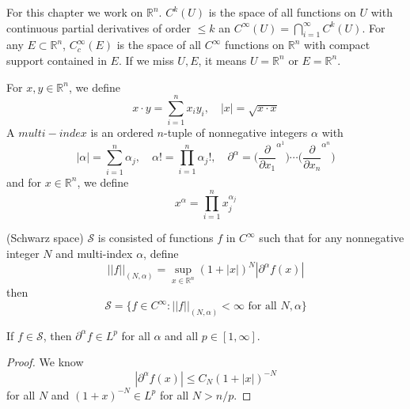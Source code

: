 \documentclass[lang=en, color=blue, ]{elegantbook}
\newcommand{\R}{\mathbb{R}}
\newcommand{\Sch}{\mathcal{S}}
\begin{document}
\begin{definition}
    For this chapter we work on $\R^n$. $C^k(U)$ is the space of all functions on $U$ with continuous partial derivatives of order $\leq k$ an $C^{\infty}(U) = \bigcap_{i=1}^{\infty}C^k(U)$. For any $E\subset \R^n$, $C_c^{\infty}(E)$ is the space of all $C^{\infty}$ functions on $\R^n$ with compact support contained in $E$. If we miss $U,E$, it means $U = \R^n$ or $E = \R^n$.\par
    For $x,y\in \R^n$, we define
    \[x\cdot y = \sum\limits_{i=1}^n x_iy_i,\quad |x| = \sqrt{x\cdot x}\]
    A $multi-index$ is an ordered $n$-tuple of nonnegative integers $\alpha$ with
    \[|\alpha| = \sum\limits_{i=1}^n \alpha_j,\quad \alpha! = \prod_{i=1}^n \alpha_j!,\quad \partial^{\alpha} = \Big(\dfrac{\partial}{\partial x_1}^{\alpha^1}\Big)\cdots\Big(\dfrac{\partial}{\partial x_n}^{\alpha^n}\Big)
    \]
    and for $x\in \R^n$, we define
    \[
    x^{\alpha} = \prod_{i=1}^n x_j^{\alpha_j}
    \]
\end{definition}

\begin{definition}
    (Schwarz space) $\Sch$ is consisted of functions $f$ in $C^{\infty}$ such that for any nonnegative integer $N$ and multi-index $\alpha$, define
    \[
    ||f||_{(N,\alpha)} = \sup_{x\in\R^n}(1+|x|)^N |\partial^{\alpha}f(x)|
    \]
    then
    \[
    \Sch = \{f\in C^{\infty}:||f||_{(N,\alpha)} < \infty\text{ for all }N,\alpha\}
    \]
\end{definition}

\begin{proposition}
    If $f\in\Sch$, then $\partial^{\alpha} f \in L^p$ for all $\alpha$ and all $p\in[1,\infty]$.
\end{proposition}
\begin{proof}
    We know
    \[|\partial^{\alpha} f(x)| \leq C_N(1+|x|)^{-N}\]
    for all $N$ and $(1+x)^{-N} \in L^p$ for all $N > n/p$.   
\end{proof}
\end{document}
